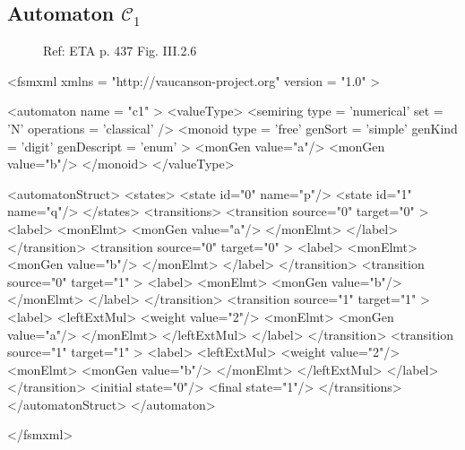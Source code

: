 \subsection{Automaton $\mathcal{C}_1$}
\label{automatonC1}

\begin{figure}[h]
  \begin{minipage}[c]{.66\textwidth}
    Ref: ETA p. 437 Fig. III.2.6
  \end{minipage}
  \begin{minipage}[c]{.34\textwidth}

  \end{minipage}
\end{figure}

{\footnotesize
\begin{listing}[5]{1}
<fsmxml  xmlns   = "http://vaucanson-project.org"
         version = "1.0" >

<automaton name = "c1" >
  <valueType>
    <semiring  type       = 'numerical'
               set        = 'N'
               operations = 'classical' />
    <monoid    type       = 'free'
               genSort    = 'simple'
               genKind    = 'digit'
               genDescript = 'enum' >
      <monGen value="a"/>
      <monGen value="b"/>
    </monoid>
  </valueType>
\end{listing}
}

\newpage

{\footnotesize
\begin{listingcont}
  <automatonStruct>
    <states>
      <state  id="0"  name="p"/>
      <state  id="1"  name="q"/>
    </states>
    <transitions>
      <transition  source="0"  target="0" >
        <label>
          <monElmt>
            <monGen value="a"/>
          </monElmt>
        </label>
      </transition>
      <transition  source="0"  target="0" >
        <label>
          <monElmt>
            <monGen value="b"/>
          </monElmt>
        </label>
      </transition>
      <transition  source="0"  target="1" >
        <label>
          <monElmt>
            <monGen value="b"/>
          </monElmt>
        </label>
      </transition>
      <transition  source="1"  target="1" >
        <label>
    <leftExtMul>
            <weight value="2"/>
      <monElmt>
        <monGen value="a"/>
      </monElmt>
    </leftExtMul>
        </label>
      </transition>
      <transition  source="1"  target="1" >
        <label>
    <leftExtMul>
            <weight value="2"/>
      <monElmt>
        <monGen value="b"/>
      </monElmt>
    </leftExtMul>
        </label>
      </transition>
      <initial  state="0"/>
      <final    state="1"/>
    </transitions>
  </automatonStruct>
</automaton>

</fsmxml>
\end{listingcont}
}

